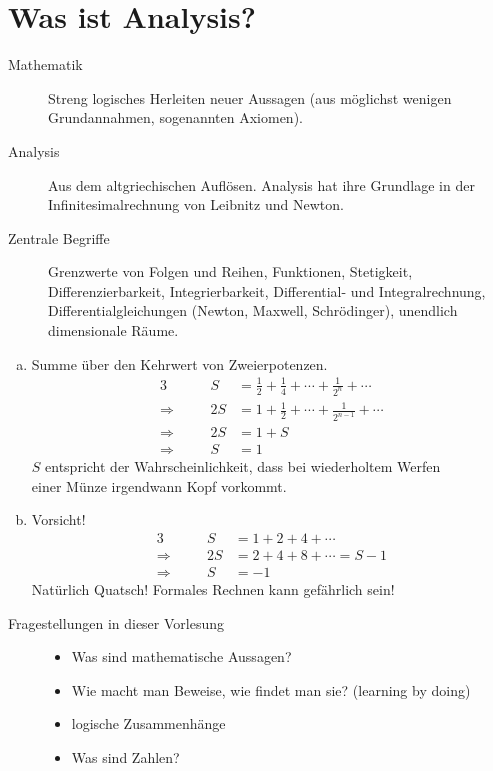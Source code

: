 \documentclass[../ana1.tex]{subfiles}
\begin{document}
\section{Was ist Analysis?}
\begin{description}
	\item[Mathematik]
		Streng logisches Herleiten neuer Aussagen (aus möglichst wenigen Grundannahmen, sogenannten Axiomen).
	\item[Analysis]
		Aus dem altgriechischen \glqq Auflösen\grqq. Analysis hat ihre Grundlage in der \glqq Infinitesimalrechnung\grqq\: von Leibnitz und Newton.
	\item[Zentrale Begriffe]
		Grenzwerte von Folgen und Reihen, Funktionen, Stetigkeit, Differenzierbarkeit, Integrierbarkeit, Differential- und Integralrechnung, Differentialgleichungen (Newton, Maxwell, Schrödinger), unendlich dimensionale Räume.
\end{description}
\begin{bspe}\leavevmode
	\begin{enumerate}[(a)]
		\item Summe über den Kehrwert von Zweierpotenzen.
			\begin{alignat*}{3}
							   &&             S &= \frac{1}{2} + \frac{1}{4} + \cdots + \frac{1}{2^{n}} + \cdots \\
				\Longrightarrow&\quad& 		 2S &= 1 + \frac{1}{2} + \cdots + \frac{1}{2^{n-1}} + \cdots \\
				\Longrightarrow&\quad& 	     2S &= 1 + S \\
				\Longrightarrow&&             S &= 1
			\end{alignat*}
			\(S\) entspricht der Wahrscheinlichkeit, dass bei wiederholtem Werfen \\
			einer Münze irgendwann Kopf vorkommt.\\
		\item Vorsicht!
			\begin{alignat*}{3}
							   &&       S &= 1 + 2 + 4 + \cdots\\
				\Longrightarrow&\quad& 2S &= 2 + 4 + 8 + \cdots = S - 1\\
				\Longrightarrow&\quad&  S &= -1
			\end{alignat*}
			Natürlich Quatsch! Formales Rechnen kann gefährlich sein!
	\end{enumerate}
\end{bspe}
\begin{description}
	\item[Fragestellungen in dieser Vorlesung]\leavevmode
		\begin{itemize}
			\item Was sind mathematische Aussagen?
			\item Wie macht man Beweise, wie findet man sie? (learning by doing)
			\item logische Zusammenhänge
			\item Was sind Zahlen?
		\end{itemize} 
\end{description}
\end{document}
